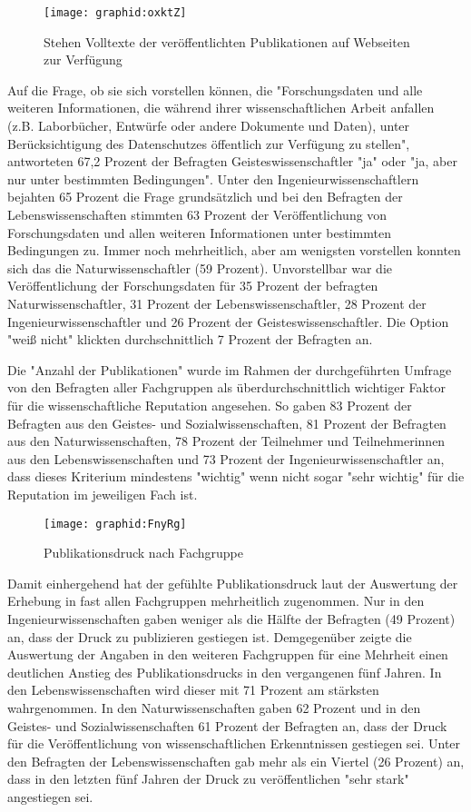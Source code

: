 \begin{figure}[h!]
\texttt{[image: graphid:oxktZ]}
\caption{Stehen Volltexte der veröffentlichten Publikationen auf Webseiten zur Verfügung}
\end{figure}

Auf die Frage, ob sie sich vorstellen können, die "Forschungsdaten und alle weiteren Informationen, die während ihrer wissenschaftlichen Arbeit anfallen (z.B. Laborbücher, Entwürfe oder andere Dokumente und Daten), unter Berücksichtigung des Datenschutzes öffentlich zur Verfügung zu stellen", antworteten 67,2 Prozent der Befragten Geisteswissenschaftler "ja" oder "ja, aber nur unter bestimmten Bedingungen". Unter den Ingenieurwissenschaftlern bejahten 65 Prozent die Frage grundsätzlich und bei den Befragten der Lebenswissenschaften stimmten 63 Prozent der Veröffentlichung von Forschungsdaten und allen weiteren Informationen unter bestimmten Bedingungen zu. Immer noch mehrheitlich, aber am wenigsten vorstellen konnten sich das die Naturwissenschaftler (59 Prozent). Unvorstellbar war die Veröffentlichung der Forschungsdaten für 35 Prozent der befragten Naturwissenschaftler, 31 Prozent der Lebenswissenschaftler, 28 Prozent der Ingenieurwissenschaftler und 26 Prozent der Geisteswissenschaftler. Die Option "weiß nicht" klickten durchschnittlich 7 Prozent der Befragten an.

Die "Anzahl der Publikationen" wurde im Rahmen der durchgeführten Umfrage von den Befragten aller Fachgruppen als überdurchschnittlich wichtiger Faktor für die wissenschaftliche Reputation angesehen. So gaben 83 Prozent der Befragten aus den Geistes- und Sozialwissenschaften, 81 Prozent der Befragten aus den Naturwissenschaften, 78 Prozent der Teilnehmer und Teilnehmerinnen aus den Lebenswissenschaften und 73 Prozent der Ingenieurwissenschaftler an, dass dieses Kriterium mindestens "wichtig" wenn nicht sogar "sehr wichtig" für die Reputation im jeweiligen Fach ist.

\begin{figure}[h!]
\texttt{[image: graphid:FnyRg]}
\caption{Publikationsdruck nach Fachgruppe}
\end{figure}

Damit einhergehend hat der gefühlte Publikationsdruck laut der Auswertung der Erhebung in fast allen Fachgruppen mehrheitlich zugenommen. Nur in den Ingenieurwissenschaften gaben weniger als die Hälfte der Befragten (49 Prozent) an, dass der Druck zu publizieren gestiegen ist. Demgegenüber zeigte die Auswertung der Angaben in den weiteren Fachgruppen für eine Mehrheit einen deutlichen Anstieg des Publikationsdrucks in den vergangenen fünf Jahren. In den Lebenswissenschaften wird dieser mit 71 Prozent am stärksten wahrgenommen. In den Naturwissenschaften gaben 62 Prozent und in den Geistes- und Sozialwissenschaften 61 Prozent der Befragten an, dass der Druck für die Veröffentlichung von wissenschaftlichen Erkenntnissen gestiegen sei. Unter den Befragten der Lebenswissenschaften gab mehr als ein Viertel (26 Prozent) an, dass in den letzten fünf Jahren der Druck zu veröffentlichen "sehr stark" angestiegen sei.


